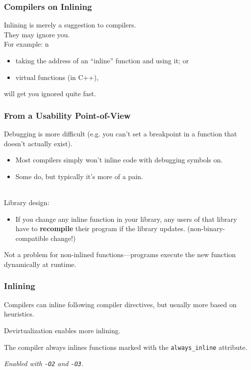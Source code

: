 \begin{frame}
  \frametitle{Compilers on Inlining}

  

  Inlining is merely a suggestion to compilers.\\
  They may ignore you.\\[1em]

  For example:
n  \begin{itemize}
    \item taking the address of an ``inline'' function and using it; or
    \item virtual functions (in C++),
  \end{itemize}
  will get you ignored quite fast.
  
\end{frame}

\begin{frame}
  \frametitle{From a Usability Point-of-View}

  
  Debugging is more difficult (e.g. you can't set a breakpoint in a function that
  doesn't actually exist).
  \begin{itemize}
    \item Most compilers simply won't inline code with debugging symbols on.
    \item Some do, but typically it's more of a pain.
  \end{itemize}~\\[1em]

  Library design:
  \begin{itemize}
    \item If you change any inline function in your library, any users
      of that library have to {\bf recompile} their program if the
      library updates. (non-binary-compatible change!)
  \end{itemize}
  Not a problem for non-inlined functions---programs execute the new function
      dynamically at runtime.

  
\end{frame}


\begin{frame}
\frametitle{Inlining}

 Compilers can inline following compiler directives, but usually more based on heuristics. 
 
 Devirtualization enables more inlining. 
 
 The compiler always inlines functions marked with the {\tt always\_inline} attribute.

\noindent \emph{Enabled with {\tt -O2} and {\tt -O3}.}

\end{frame}

